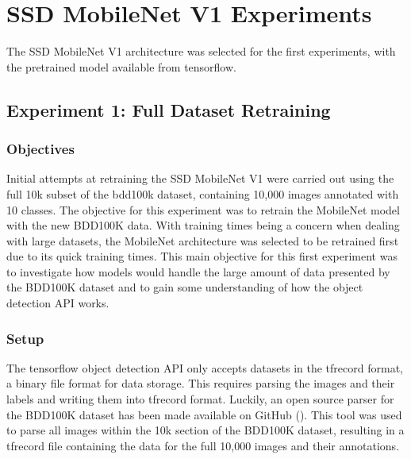 \documentclass[12pt]{report}
\begin{document}
\section{SSD MobileNet V1 Experiments}
\begin{flushleft}
The SSD MobileNet V1 architecture was selected for the first experiments, with the pretrained model available from tensorflow.
\end{flushleft}

\subsection{Experiment 1: Full Dataset Retraining}
\subsubsection*{Objectives}
\begin{flushleft}
Initial attempts at retraining the SSD MobileNet V1 were carried out using the full 10k subset of the bdd100k dataset, containing 10,000 images annotated with 10 classes. The objective for this experiment was to retrain the MobileNet model with the new BDD100K data. With training times being a concern when dealing with large datasets, the MobileNet architecture was selected to be retrained first due to its quick training times. This main objective for this first experiment was to investigate how models would handle the large amount of data presented by the BDD100K dataset and to gain some understanding of how the object detection API works. 
\end{flushleft}

\subsubsection*{Setup}
\begin{flushleft}
The tensorflow object detection API only accepts datasets in the tfrecord format, a binary file format for data storage. This requires parsing the images and their labels and writing them into tfrecord format. Luckily, an open source parser for the BDD100K dataset has been made available on GitHub (\cite{parser}). This tool was used to parse all images within the 10k section of the BDD100K dataset, resulting in a tfrecord file containing the data for the full 10,000 images and their annotations.
\end{flushleft}
\end{document}
